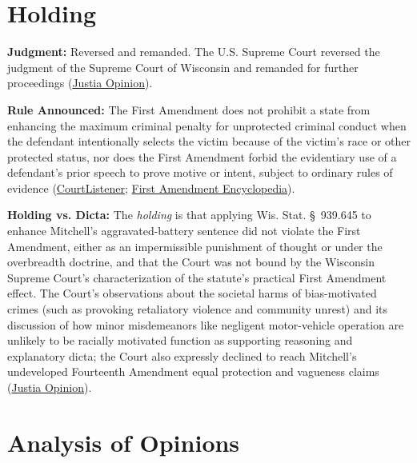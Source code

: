 \documentclass[12pt]{article}
\begin{document}
\section{Holding}
\textbf{Judgment:} Reversed and remanded. The U.S. Supreme Court reversed the judgment of the Supreme Court of Wisconsin and remanded for further proceedings (\href{https://supreme.justia.com/cases/federal/us/508/476/}{Justia Opinion}).

\textbf{Rule Announced:} The First Amendment does not prohibit a state from enhancing the maximum criminal penalty for unprotected criminal conduct when the defendant intentionally selects the victim because of the victim's race or other protected status, nor does the First Amendment forbid the evidentiary use of a defendant's prior speech to prove motive or intent, subject to ordinary rules of evidence (\href{https://www.courtlistener.com/opinion/112879/wisconsin-v-mitchell/}{CourtListener}; \href{https://firstamendment.mtsu.edu/article/wisconsin-v-mitchell/}{First Amendment Encyclopedia}).

\textbf{Holding vs. Dicta:} The \textit{holding} is that applying Wis. Stat. \S~939.645 to enhance Mitchell's aggravated-battery sentence did not violate the First Amendment, either as an impermissible punishment of thought or under the overbreadth doctrine, and that the Court was not bound by the Wisconsin Supreme Court's characterization of the statute's practical First Amendment effect. The Court's observations about the societal harms of bias-motivated crimes (such as provoking retaliatory violence and community unrest) and its discussion of how minor misdemeanors like negligent motor-vehicle operation are unlikely to be racially motivated function as supporting reasoning and explanatory dicta; the Court also expressly declined to reach Mitchell's undeveloped Fourteenth Amendment equal protection and vagueness claims (\href{https://supreme.justia.com/cases/federal/us/508/476/}{Justia Opinion}).

\section{Analysis of Opinions}
\end{document}

